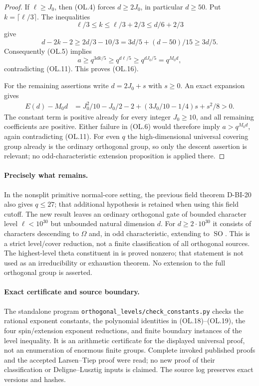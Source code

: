 \begin{proof}
If $\ell\ge J_0$, then (OL.4) forces $d\ge2J_0$, in
particular $d\ge50$. Put $k=\lceil\ell/3\rceil$.
The inequalities
\[
 \ell/3\le k\le\ell/3+2/3\le d/6+2/3
\]
give
\[
 d-2k-2\ge2d/3-10/3
             =3d/5+(d-50)/15\ge3d/5.
\]
Consequently (OL.5) implies
\[
                      a\ge q^{3dk/5}\ge q^{d\ell/5}
                        \ge q^{dJ_0/5}=q^{M_0d},
                                                               \tag{OL.18}
\]
contradicting (OL.11). This proves (OL.16).

For the remaining assertions write $d=2J_0+s$ with $s\ge0$.
An exact expansion gives
\[
 \begin{split}
 E(d)-M_0d
  &=J_0^2/10-J_0/2-2
      +(3J_0/10-1/4)s+s^2/8>0.
 \end{split}
                                                               \tag{OL.19}
\]
The constant term is positive already for every integer
$J_0\ge10$, and all remaining coefficients are positive.
Either failure in (OL.6) would therefore imply
$a>q^{M_0d}$, again contradicting (OL.11).
For even $q$ the high-dimensional universal covering group
already is the ordinary orthogonal group, so only the descent
assertion is relevant; no odd-characteristic extension
proposition is applied there.
\end{proof}

\paragraph{Precisely what remains.}
In the nonsplit primitive normal-core setting, the previous
field theorem D-BI-20 also gives $q\le27$; that additional
hypothesis is retained when using this field cutoff. The new
result leaves an ordinary orthogonal gate of bounded character
level $\ell<10^{30}$ but unbounded natural dimension $d$.
For $d\ge2\cdot10^{30}$ it consists of characters descending
to $\Omega$ and, in odd characteristic, extending to
$\operatorname{SO}$. This is a strict level/cover reduction,
not a finite classification of all orthogonal sources.
The highest-level theta constituent in
\cite[Corollary~4.7, p.~174]{OL:GLT2024} is proved nonzero;
that statement is not used as an irreducibility or exhaustion
theorem. No extension to the full orthogonal group is asserted.

\paragraph{Exact certificate and source boundary.}
The standalone program \texttt{orthogonal\_levels/check\_constants.py}
checks the rational exponent constants, the polynomial identities
in (OL.18)--(OL.19), the four spin/extension exponent reductions,
and finite boundary instances of the level inequality. It is
an arithmetic certificate for the displayed universal proof,
not an enumeration of enormous finite groups. Complete invoked
published proofs and the accepted Larsen--Tiep proof were read;
no new proof of their classification or Deligne--Lusztig inputs
is claimed. The source log preserves exact versions and hashes.

